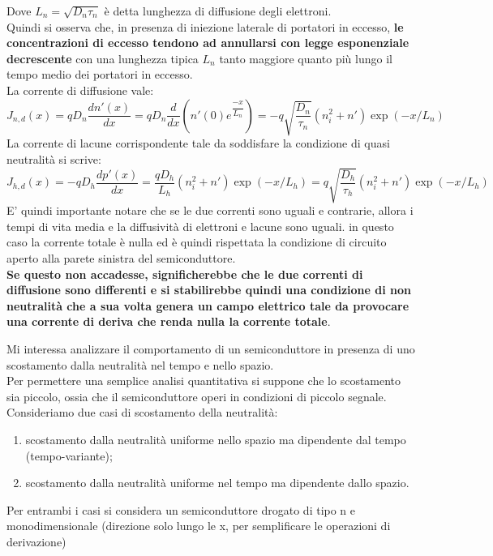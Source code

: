Dove $L_n=\sqrt{D_n \tau_n}$ è detta lunghezza di diffusione degli elettroni.\\
Quindi si osserva che, in presenza di iniezione laterale di portatori in eccesso, \textbf{le concentrazioni di eccesso tendono ad annullarsi con legge esponenziale decrescente} con una lunghezza tipica $L_n$  tanto maggiore quanto più lungo il tempo medio dei portatori in eccesso.\\
La corrente di diffusione vale:
%
\begin{equation}
    J_{n,d}(x)=qD_n \dfrac{dn'(x)}{dx}=qD_n \dfrac{d}{dx}\left( n'(0) e^{\dfrac{-x}{L_n}}\right)=-q\sqrt{\dfrac{D_n}{\tau_n}}(n_i^2+n')\exp(-x/L_n)
\end{equation}
%
La corrente di lacune corrispondente tale da soddisfare la condizione di quasi neutralità si scrive:
%
\begin{equation}
    J_{h,d}(x)=-qD_h \dfrac{dp'(x)}{dx}=\dfrac{qD_h}{L_h}(n_i^2+n')\exp(-x/L_h)=q\sqrt{\dfrac{D_h}{\tau_h}}(n_i^2+n')\exp(-x/L_h)
\end{equation}
%
E' quindi importante notare che se le due correnti sono uguali e contrarie, allora i tempi di vita media e la diffusività di elettroni e lacune sono uguali. in questo caso la corrente totale è nulla ed è quindi rispettata la condizione di circuito aperto alla parete sinistra del semiconduttore. \\
%
\textbf{Se questo non accadesse, significherebbe che le due correnti di diffusione sono differenti e si stabilirebbe quindi una condizione di non neutralità che a sua volta genera un campo elettrico tale da provocare una corrente di deriva che renda nulla la corrente totale}.

Mi interessa analizzare il comportamento di un semiconduttore in presenza di uno scostamento dalla neutralità nel tempo e nello spazio.\\
Per permettere una semplice analisi quantitativa si suppone che lo scostamento sia piccolo, ossia che il semiconduttore operi in condizioni di piccolo segnale.\\
Consideriamo due casi di scostamento della neutralità:
%
\begin{enumerate}
    \item scostamento dalla neutralità uniforme nello spazio ma dipendente dal tempo (tempo-variante);
    \item scostamento dalla neutralità uniforme nel tempo ma dipendente dallo spazio.
\end{enumerate}
%
Per entrambi i casi si considera un semiconduttore drogato di tipo n e monodimensionale (direzione solo lungo le x, per semplificare le operazioni di derivazione)\\


